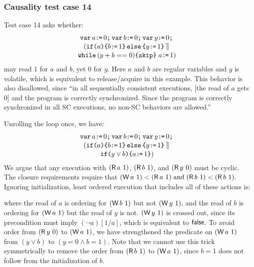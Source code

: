 \subsubsection{Causality test case 14}

Test case 14 asks whether:
\begin{multline*}
  \texttt{var}\, a\texttt{:}\mkern-1mu\texttt{=}\, 0\texttt{;}\,
  \texttt{var}\, b\texttt{:}\mkern-1mu\texttt{=}\, 0\texttt{;}\,
  \texttt{var}\, y\texttt{:}\mkern-1mu\texttt{=}\, 0\texttt{;}\,\\[-.5ex]
  (\texttt{if}\allowbreak\texttt{(}a\texttt{)}\allowbreak\texttt{\{} b\texttt{:}\mkern-1mu\texttt{=}\, 1\texttt{\}}\,\allowbreak\texttt{else}\allowbreak\,\texttt{\{} y\texttt{:}\mkern-1mu\texttt{=}\, 1\texttt{\}} 
  \,\mathbin{\rrceil}\,\\[-.5ex]
  \texttt{while}\,(y+b==0) \allowbreak\texttt{\{}\texttt{skip}\texttt{\}}\; a\texttt{:}\mkern-1mu\texttt{=}\,1)
\end{multline*}
may read $1$ for $a$ and $b$, yet $0$ for $y$.  Here $a$ and $b$ are regular
variables and $y$ is volatile, which is equivalent to release/acquire in this
example.  This behavior is also disallowed, since ``in all sequentially
consistent executions, [the read of $a$ gets $0$] and the program is
correctly synchronized. Since the program is correctly synchronized in all SC
executions, no non-SC behaviors are allowed.''

Unrolling the loop once, we have:
\begin{multline*}
  \texttt{var}\, a\texttt{:}\mkern-1mu\texttt{=}\, 0\texttt{;}\,
  \texttt{var}\, b\texttt{:}\mkern-1mu\texttt{=}\, 0\texttt{;}\,
  \texttt{var}\, y\texttt{:}\mkern-1mu\texttt{=}\, 0\texttt{;}\,\\[-.5ex]
  (\texttt{if}\allowbreak\texttt{(}a\texttt{)}\allowbreak\texttt{\{} b\texttt{:}\mkern-1mu\texttt{=}\, 1\texttt{\}}\,\allowbreak\texttt{else}\allowbreak\,\texttt{\{} y\texttt{:}\mkern-1mu\texttt{=}\, 1\texttt{\}} 
  \,\mathbin{\rrceil}\,\\[-.5ex]
  \texttt{if}\allowbreak\texttt{(}y\lor b\texttt{)}\allowbreak\texttt{\{} a\texttt{:}\mkern-1mu\texttt{=}\, 1\texttt{\}})
\end{multline*}
We argue that any execution with $(\DR{a}{1})$, $(\DR{b}{1})$, and
$(\DR{y}{0})$ must be cyclic.  The closure requirements require that
\begin{math}
  (\DW{a}{1})\lt(\DR{a}{1})
  \;\text{and}\;
  (\DR{b}{1})\lt(\DR{b}{1}).
\end{math}
Ignoring initialization, least ordered execution that includes all of these
actions is:
\begin{tikzdisplay}[node distance=1em]
\end{tikzdisplay}
where the read of $a$ is ordering for $(\DW{b}{1})$ but
not $(\DW{y}{1})$, and the read of $b$ is ordering for $(\DW{a}{1})$ but the
read of $y$ is not.  $(\DW{y}{1})$ is crossed out, since its
precondition must imply $(\lnot a)[1/a]$, which is equivalent to $\mathsf{false}$.
To avoid order from $(\DR{y}{0})$ to $(\DW{a}{1})$, we
have strengthened the predicate on $(\DW{a}{1})$ from $(y\lor b)$ to
$(y=0\land b=1)$.  Note that we cannot use this trick symmetrically to remove
the order from $(\DR{b}{1})$ to $(\DW{a}{1})$, since $b=1$ does not follow
from the initialization of $b$.


